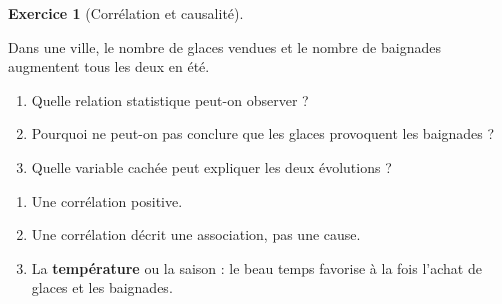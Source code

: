 \documentclass[
  french,
  letterpaper,
  open=any]{scrbook}
\providecommand{\tightlist}{%
  \setlength{\itemsep}{0pt}\setlength{\parskip}{0pt}}
\theoremstyle{definition}
\theoremstyle{definition}
\newtheorem{exercise}{Exercice}[section]
\theoremstyle{remark}
\begin{document}
\begin{exercise}[Corrélation et
causalité]\protect\hypertarget{exr-eda-7}{}\label{exr-eda-7}

Dans une ville, le nombre de glaces vendues et le nombre de baignades
augmentent tous les deux en été.

\begin{enumerate}
\def\labelenumi{\alph{enumi}.}
\tightlist
\item
  Quelle relation statistique peut-on observer ?
\item
  Pourquoi ne peut-on pas conclure que les glaces provoquent les
  baignades ?
\item
  Quelle variable cachée peut expliquer les deux évolutions ?
\end{enumerate}

\end{exercise}

\begin{tcolorbox}[enhanced jigsaw, arc=.35mm, bottomrule=.15mm, bottomtitle=1mm, breakable, colback=white, colbacktitle=quarto-callout-tip-color!10!white, colframe=quarto-callout-tip-color-frame, coltitle=black, left=2mm, leftrule=.75mm, opacityback=0, opacitybacktitle=0.6, rightrule=.15mm, title=\textcolor{quarto-callout-tip-color}{\faLightbulb}\hspace{0.5em}{Solution de l'exercice Exercice~\ref{exr-eda-7}}, titlerule=0mm, toprule=.15mm, toptitle=1mm]

\begin{enumerate}
\def\labelenumi{\alph{enumi}.}
\tightlist
\item
  Une corrélation positive.
\item
  Une corrélation décrit une association, pas une cause.
\item
  La \textbf{température} ou la saison : le beau temps favorise à la
  fois l'achat de glaces et les baignades.
\end{enumerate}

\end{tcolorbox}
\end{document}
